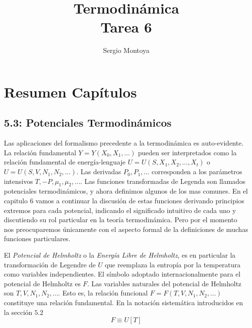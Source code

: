 \documentclass{report}
\title{\Huge{Termodinámica}\\Tarea 6}
\author{\huge{Sergio Montoya}}
\date{}
\begin{document}
\maketitle
\newpage%
\tableofcontents
\pagebreak

\chapter{Resumen Capítulos}
\section{5.3: Potenciales Termodinámicos}

Las aplicaciones del formalismo precedente a la termodinámica es auto-evidente. La relación fundamental $Y=Y(X_0,X_1,\ldots)$ pueden ser interpretados como la relación fundamental de energía-lenguaje  $U=U(S,X_1,X_2,\ldots,X_t)$ o $U=U(S,V,N_1,N_2,\ldots)$. Las derivadas $P_0,P_1,\ldots$ corresponden a los parámetros intensivos $T,-P,\mu_1,\mu_2,\ldots$. Las funciones transformadas de Legenda son llamados potenciales termodinámicos, y ahora definimos algunos de los mas comunes. En el capitulo 6 vamos a continuar la discusión de estas funciones derivando principios extremos para cada potencial, indicando el significado intuitivo de cada uno y discutiendo su rol particular en la teoría termodinámica. Pero por el momento nos preocuparemos únicamente con el aspecto formal de la definiciones de muchas funciones particulares.

El \textit{Potencial de Helmholtz} o la \textit{Energía Libre de Helmholtz}, es en particular la transformación de Legendre de $U$ que reemplaza la entropía por la temperatura como variables independientes. El símbolo adoptado internacionalmente para el potencial de Helmholtz es $F$. Las variables naturales del potencial de Helmholtz son $T,V,N_1,N_2,\ldots$. Esto es, la relación funcional $F=F(T,V,N_1,N_2,\ldots)$ constituye una relación fundamental. En la notación sistemática introducidos en la sección $5.2$
\begin{equation}
  \label{5.38}
  F\equiv U\left[ T \right]
\end{equation}
\end{document}
